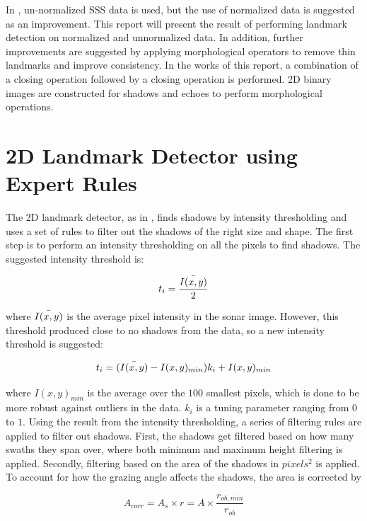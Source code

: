 In \cite{Al-Rawi2017LandmarkImages}, un-normalized SSS data is used, but the use of normalized data is suggested as an improvement. This report will present the result of performing landmark detection on normalized and unnormalized data. In addition, further improvements are suggested by applying morphological operators to remove thin landmarks and improve consistency. In the works of this report, a combination of a closing operation followed by a closing operation is performed. 2D binary images are constructed for shadows and echoes to perform morphological operations.  

\section{2D Landmark Detector using Expert Rules}

The 2D landmark detector, as in \cite{Leblond2019SonarProject}, finds shadows by intensity thresholding and uses a set of rules to filter out the shadows of the right size and shape. The first step is to perform an intensity thresholding on all the pixels to find shadows. The suggested intensity threshold is:

\begin{equation}
    t_i = \frac{\Bar{I(x,y)}}{2}
    \label{eq:orginal_int_thres}
\end{equation}

where $\Bar{I(x,y)}$ is the average pixel intensity in the sonar image. However, this threshold produced close to no shadows from the data, so a new intensity threshold is suggested:

\begin{equation}
    t_i = (\Bar{I(x,y)} - I(x,y)_{min}) k_i + I(x,y)_{min} 
\end{equation}

where $I(x,y)_{min}$ is the average over the $100$ smallest pixels, which is done to be more robust against outliers in the data. $k_i$ is a tuning parameter ranging from $0$ to $1$. Using the result from the intensity thresholding, a series of filtering rules are applied to filter out shadows. First, the shadows get filtered based on how many swaths they span over, where both minimum and maximum height filtering is applied. Secondly, filtering based on the area of the shadows in $pixels^2$ is applied. To account for how the grazing angle affects the shadows, the area is corrected by

\begin{equation}
    A_{corr} = A_s \times r = A \times \frac{r_{ob,min}}{r_{ob}}
    \label{eq:corrected_area}
\end{equation}

